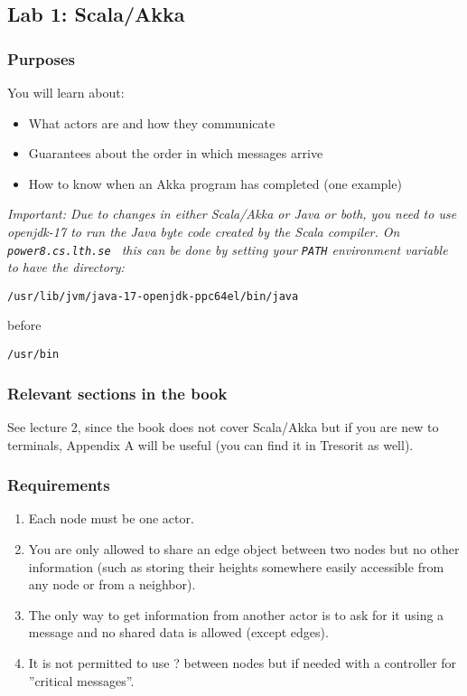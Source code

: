 \documentclass{forsete}
\begin{document}
\newpage
\subsection*{Lab 1: Scala/Akka}
\subsubsection*{Purposes}
You will learn about:
\begin{itemize}
\item What actors are and how they communicate
\item Guarantees about the order in which messages arrive
\item How to know when an Akka program has completed (one example)
\end{itemize}
{\em Important: Due to changes in either Scala/Akka or Java or both, you need to use openjdk-17 to run the Java byte code created by the Scala compiler.
On {\tt power8.cs.lth.se } this can be done by setting your {\tt PATH} environment variable to have the
directory: 

{\tt /usr/lib/jvm/java-17-openjdk-ppc64el/bin/java}

\noindent before 

{\tt /usr/bin}

\subsubsection*{Relevant sections in the book}
See lecture 2, since the book does not cover Scala/Akka but if you are new to terminals, Appendix A will be useful (you can find it in Tresorit as well).
\subsubsection*{Requirements}
\begin{enumerate}
\item Each node must be one actor.
\item You are only allowed to share an edge object between two nodes but no other information (such as storing their
heights somewhere easily accessible from any node or from a neighbor).
\item The only way to get information from another actor is to ask for it using a message and no shared data is allowed (except edges).
\item It is not permitted to use ? between nodes but if needed with a controller for 
''critical messages''.


\end{enumerate}}
\end{document}
